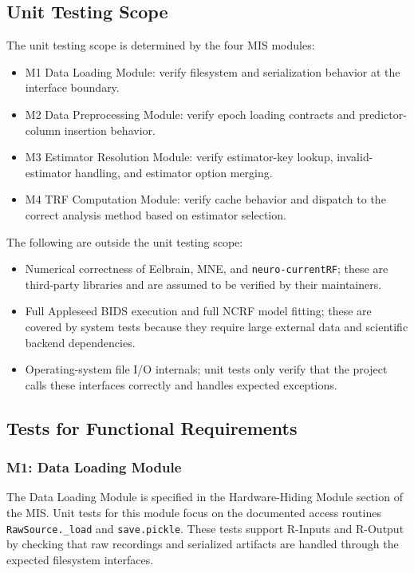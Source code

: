 \documentclass[12pt, titlepage]{article}
\begin{document}
\subsection{Unit Testing Scope}

The unit testing scope is determined by the four MIS modules:
\begin{itemize}
  \item M1 Data Loading Module: verify filesystem and serialization behavior at the interface boundary.
  \item M2 Data Preprocessing Module: verify epoch loading contracts and predictor-column insertion behavior.
  \item M3 Estimator Resolution Module: verify estimator-key lookup, invalid-estimator handling, and estimator option merging.
  \item M4 TRF Computation Module: verify cache behavior and dispatch to the correct analysis method based on estimator selection.
\end{itemize}

The following are outside the unit testing scope:
\begin{itemize}
  \item Numerical correctness of Eelbrain, MNE, and \texttt{neuro-currentRF}; these are third-party libraries and are assumed to be verified by their maintainers.
  \item Full Appleseed BIDS execution and full NCRF model fitting; these are covered by system tests because they require large external data and scientific backend dependencies.
  \item Operating-system file I/O internals; unit tests only verify that the project calls these interfaces correctly and handles expected exceptions.
\end{itemize}

\subsection{Tests for Functional Requirements}

\subsubsection{M1: Data Loading Module}

The Data Loading Module is specified in the Hardware-Hiding Module section of the MIS. Unit tests for this module focus on the documented access routines \texttt{RawSource.\_load} and \texttt{save.pickle}. These tests support R-Inputs and R-Output by checking that raw recordings and serialized artifacts are handled through the expected filesystem interfaces.
\end{document}
